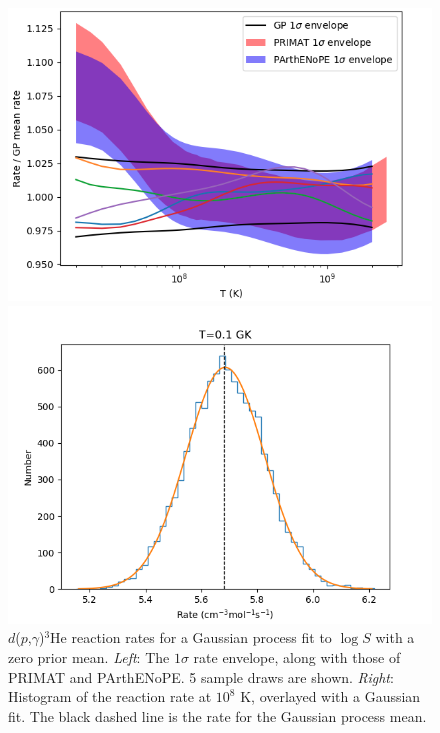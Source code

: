 \documentclass[%
 reprint,
superscriptaddress,
nofootinbib,
 amsmath,amssymb,
 aps,
 pra,
]{revtex4-2}
\begin{document}
\begin{figure}
\end{figure}

\begin{figure}
	\centering
	\begin{minipage}{0.48\textwidth}
		\centering
		\includegraphics[width=\linewidth]{Figures/dphe3g_log_rate.png}
	\end{minipage}
	\hspace{0mm}
	\begin{minipage}{0.48\textwidth}
		\centering
		\includegraphics[width=\linewidth]{Figures/dphe3g_gaussian_rate.png}
	\end{minipage}
	\caption{$d$($p$,$\gamma$)$^3$He reaction rates for a Gaussian process fit to $\log S$ with a zero prior mean. \textit{Left}: The $1\sigma$ rate envelope, along with those of PRIMAT and PArthENoPE. 5 sample draws are shown. \textit{Right}: Histogram of the reaction rate at $10^8$ K, overlayed with a Gaussian fit. The black dashed line is the rate for the Gaussian process mean. }
\end{figure}
\end{document}
